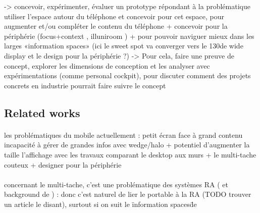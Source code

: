 

-> concevoir, expérimenter, évaluer un prototype répondant à la problématique
utiliser l'espace autour du téléphone et concevoir pour cet espace, pour augmenter et/ou compléter le contenu du téléphone 
+ concevoir pour la périphérie (focus+context \cite{CockburnKarlsonBederson2009}, illuniroom \cite{JonesBenkoOfekEtAl2013}) 
+ pour pouvoir naviguer mieux dans les larges «information spaces» \cite{RaedleJetterMuellerEtAl2014} (ici le sweet spot va converger vers le 130\textdegree de wide display et le design pour la périphérie ?) -> Pour cela, faire une preuve de concept, explorer les dimensions de conception et les analyser avec expérimentations (comme personal cockpit), pour discuter comment des projets concrets en industrie pourrait faire suivre le concept


\subsection*{Related works}
\paragraph*{}
les problématiques du mobile actuellement : petit écran face à grand contenu 
incapacité à gérer de grandes infos 
avec wedge/halo \cite{BaudischRosenholtz2003} \cite{GustafsonBaudischGutwinEtAl2008} \cite{BurigatChittaro2011} 
+ potentiel d'augmenter la taille l'affichage avec les travaux comparant le desktop aux murs \cite{LiuChapuisBeaudouin-LafonEtAl2014} \cite{ShuppBallYostEtAl2006} \cite{TanGergleScupelliEtAl2003}
+ le multi-tache couteux \cite{EnsFinneganIrani2014} \cite{RashidNacentaQuigley2012a}
+ designer pour la périphérie \cite{JonesBenkoOfekEtAl2013} \cite{CockburnKarlsonBederson2009}

\paragraph*{}
concernant le multi-tache, c'est une problématique des systèmes RA (\cite{SchmalstiegFuhrmannHesinaEtAl2002} et background de \cite{EnsFinneganIrani2014}) : donc c'est naturel de lier le portable à la RA (TODO trouver un article le disant), surtout si on suit le \"information spaces\" de \cite{EnsHincapie-RamosIrani2014}
\cite{TanCzerwinski2003}

